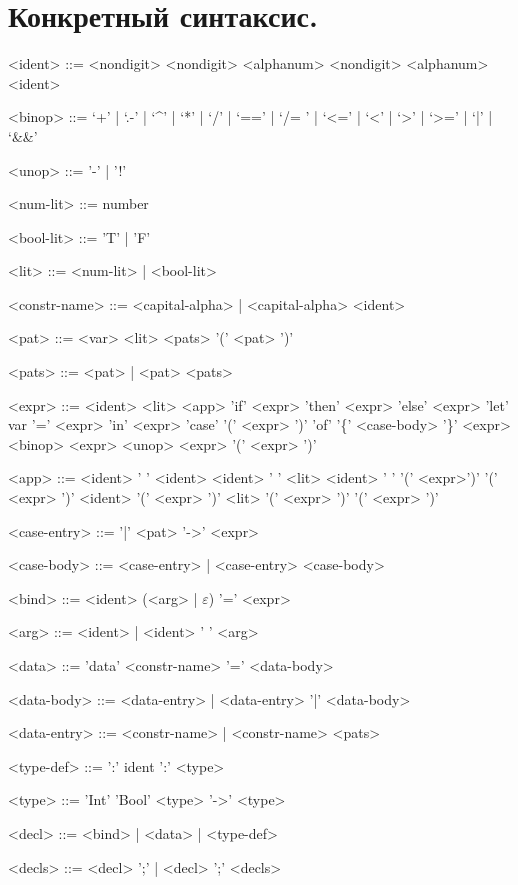 \documentclass[12pt, a4paper] {ncc}
\begin{document}
\setcounter{figure}{0}

\section{Конкретный синтаксис.}
\begin{grammar}
<ident> ::= <nondigit> \alt <nondigit> <alphanum> \alt <nondigit> <alphanum> <ident>

<binop> ::= `+' | `.-' | `^' | `*' | `/' | `==' | `/= ' | `<=' | `<' | `>' | `>=' | `|' | `\&\&'

<unop> ::= '-' | '!'

<num-lit> ::= number

<bool-lit> ::= 'T' | 'F'

<lit> ::= <num-lit> | <bool-lit>

<constr-name> ::= <capital-alpha> | <capital-alpha> <ident>

<pat> ::= <var>
\alt <lit>
 <pats>
\alt '(' <pat> ')'

<pats> ::= <pat> | <pat> <pats>

<expr> ::= <ident>
\alt <lit>
\alt <app>
\alt 'if' <expr> 'then' <expr> 'else' <expr>
\alt 'let' var '=' <expr> 'in' <expr>
\alt 'case' '(' <expr> ')' 'of' '\{' <case-body> '\}'
\alt  <expr> <binop> <expr>
\alt <unop> <expr>
\alt '(' <expr> ')'

<app> ::=  <ident> ' ' <ident>
\alt <ident> ' ' <lit>
\alt <ident> ' ' '(' <expr>')'
\alt '(' <expr> ')' <ident>
\alt '(' <expr> ')' <lit>
\alt '(' <expr> ')' '(' <expr> ')'

<case-entry> ::= '|' <pat> '->' <expr> 

<case-body> ::= <case-entry> | <case-entry> <case-body>

<bind> ::= <ident> (<arg> | $\varepsilon$) '=' <expr>

<arg> ::= <ident> | <ident> ' ' <arg>

<data> ::= 'data' <constr-name> '=' <data-body>

<data-body> ::= <data-entry> | <data-entry> '|' <data-body>

<data-entry> ::= <constr-name> | <constr-name> <pats>

<type-def> ::= ':' ident ':' <type>

<type> ::= 'Int'
\alt 'Bool'
\alt <type> '->' <type>

<decl> ::= <bind> | <data> | <type-def>

<decls> ::= <decl> ';' | <decl> ';' <decls>

\end{grammar}
\end{document}
